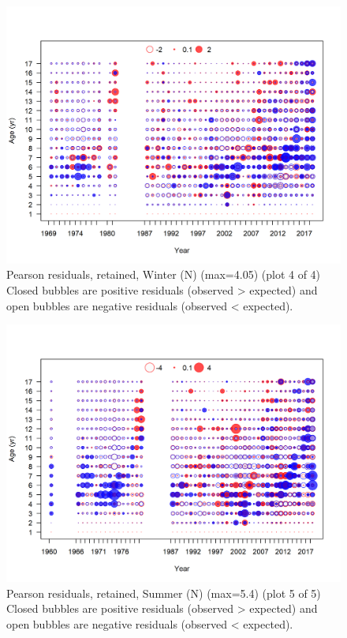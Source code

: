 \documentclass[12pt,]{article}
\begin{document}
\FloatBarrier

\begin{figure}
\centering
\includegraphics{r4ss/plots_mod1/comp_agefit_residsflt1mkt2_page4.png}
\caption{Pearson residuals, retained, Winter (N) (max=4.05) (plot 4 of
4)\\
Closed bubbles are positive residuals (observed \textgreater{} expected)
and open bubbles are negative residuals (observed \textless{} expected).
\label{fig:wn_age_pearson}}
\end{figure}

\begin{figure}
\centering
\includegraphics{r4ss/plots_mod1/comp_agefit_residsflt2mkt2_page5.png}
\caption{Pearson residuals, retained, Summer (N) (max=5.4) (plot 5 of
5)\\
Closed bubbles are positive residuals (observed \textgreater{} expected)
and open bubbles are negative residuals (observed \textless{} expected).
\label{fig:sn_age_pearson}}
\end{figure}
\end{document}
